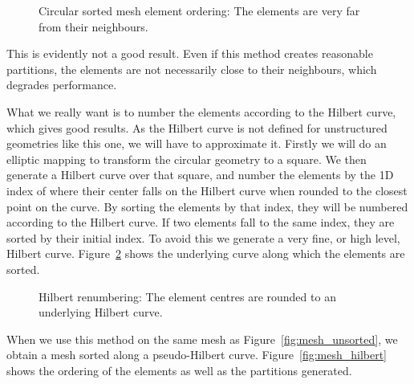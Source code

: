 \begin{figure}[H]
    \centering
    
    \caption{Circular sorted mesh element ordering: The elements are very far from their neighbours.}\label{fig:mesh_circular_ordering}
\end{figure}

This is evidently not a good result. Even if this method creates reasonable partitions, the elements
are not necessarily close to their neighbours, which degrades performance.

What we really want is to number the elements according to the Hilbert curve, which gives good
results. As the Hilbert curve is not defined for unstructured geometries like this one, we will have
to approximate it. Firstly we will do an elliptic mapping to transform the circular geometry to a
square. We then generate a Hilbert curve over that square, and number the elements by the 1D index
of where their center falls on the Hilbert curve when rounded to the closest point on the curve. By
sorting the elements by that index, they will be numbered according to the Hilbert curve. If two
elements fall to the same index, they are sorted by their initial index. To avoid this we generate a
very fine, or high level, Hilbert curve. Figure~\ref{fig:hilbert_renumbering} shows the underlying
curve along which the elements are sorted.

\begin{figure}[H]
    \centering
    
    \caption{Hilbert renumbering: The element centres are rounded to an underlying Hilbert curve.}\label{fig:hilbert_renumbering}
\end{figure}

When we use this method on the same mesh as Figure~\ref{fig:mesh_unsorted}, we obtain a mesh sorted
along a pseudo-Hilbert curve. Figure~\ref{fig:mesh_hilbert} shows the ordering of the elements as
well as the partitions generated.

